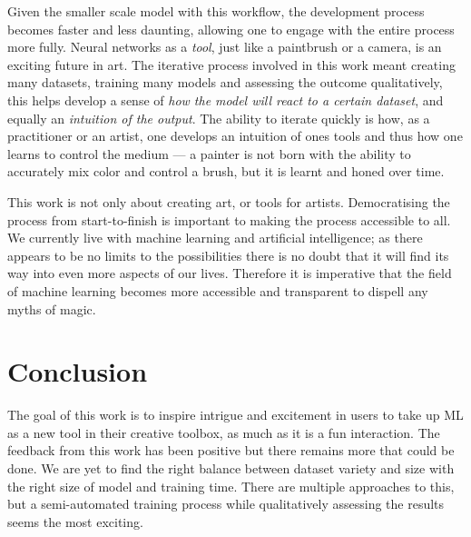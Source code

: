 \documentclass{article}
\begin{document}
Given the smaller scale model with this workflow, the development process becomes faster and less daunting, allowing one to engage with the entire process more fully. Neural networks as a \textit{tool}, just like a paintbrush or a camera, is an exciting future in art. The iterative process involved in this work meant creating many datasets, training many models and assessing the outcome qualitatively, this helps develop a sense of \textit{how the model will react to a certain dataset}, and equally an \textit{intuition of the output}. The ability to iterate quickly is how, as a practitioner or an artist, one develops an intuition of ones tools and thus how one learns to control the medium --- a painter is not born with the ability to accurately mix color and control a brush, but it is learnt and honed over time.

This work is not only about creating art, or tools for artists. Democratising the process from start-to-finish is important to making the process accessible to all. We currently live with machine learning and artificial intelligence; as there appears to be no limits to the possibilities there is no doubt that it will find its way into even more aspects of our lives. Therefore it is imperative that the field of machine learning becomes more accessible and transparent to dispell any myths of magic.

\section{Conclusion}
The goal of this work is to inspire intrigue and excitement in users to take up ML as a new tool in their creative toolbox, as much as it is a fun interaction. The feedback from this work has been positive but there remains more that could be done. We are yet to find the right balance between dataset variety and size with the right size of model and training time. There are multiple approaches to this, but a semi-automated training process while qualitatively assessing the results seems the most exciting.
\end{document}
